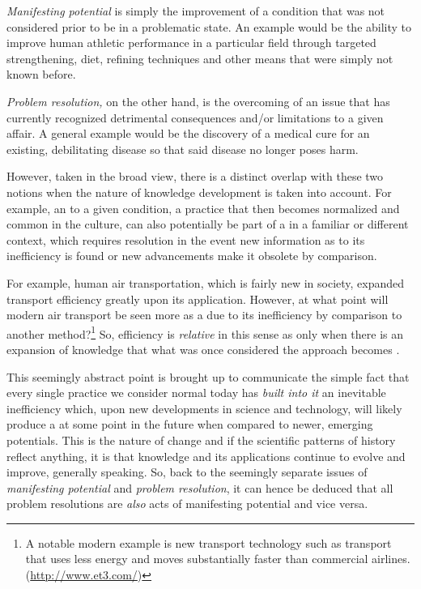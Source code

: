 \documentclass[10pt, a4paper, cleardoubleempty, openright, twoside]{book}
\begin{document}
\emph{Manifesting potential} is simply the improvement of a condition
that was not considered prior to be in a problematic state. An example
would be the ability to improve human athletic performance in a
particular field through targeted strengthening, diet, refining
techniques and other means that were simply not known before. 

\emph{ Problem resolution, } on the other hand, is the overcoming of an
issue that has currently recognized detrimental consequences and/or
limitations to a given affair. A general example would be the discovery
of a medical cure for an existing, debilitating disease so that said
disease no longer poses harm. 

However, taken in the broad view, there is a distinct overlap with these
two notions when the nature of knowledge development is taken into
account. For example, an  to a given condition, a
practice that then becomes normalized and common in the culture, can
also potentially be part of a  in a familiar or
different context, which requires resolution in the event new
information as to its inefficiency is found or new advancements make it
obsolete by comparison. 

For example, human air transportation, which is fairly new in society,
expanded transport efficiency greatly upon its application. However, at
what point will modern air transport be seen more as a
 due to its inefficiency by comparison to another
method?\footnote{
	A notable modern example is new transport technology such as
	 transport that uses less energy and moves
	substantially faster than commercial airlines.
	(\url{http://www.et3.com/})
} 
So, efficiency is \emph{relative} in this sense as only when there is an
expansion of knowledge that what was once considered the
 approach becomes .

This seemingly abstract point is brought up to communicate the simple
fact that every single practice we consider normal today has \emph{built
into it} an inevitable inefficiency which, upon new developments in
science and technology, will likely produce a  at
some point in the future when compared to newer, emerging potentials.
This is the nature of change and if the scientific patterns of history
reflect anything, it is that knowledge and its applications continue to
evolve and improve, generally speaking.  So, back to the seemingly
separate issues of \emph{manifesting potential} and \emph{problem
resolution}, it can hence be deduced that all problem resolutions are
\emph{also} acts of manifesting potential and vice versa.
\end{document}
